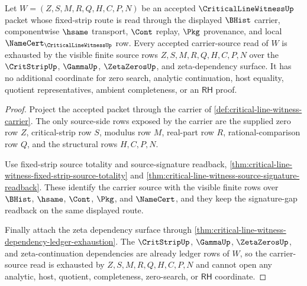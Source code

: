 \begin{theorem}
\label{thm:critical-line-witness-fixed-strip-carrier-source-totality}
Let $W=(Z,S,M,R,Q,H,C,P,N)$ be an accepted $\CriticalLineWitnessUp$ packet whose fixed-strip route is read through the displayed $\BHist$ carrier, componentwise $\hsame$ transport, $\Cont$ replay, $\Pkg$ provenance, and local $\NameCert_{\CriticalLineWitnessUp}$ row. Every accepted carrier-source read of $W$ is exhausted by the visible finite source rows $Z,S,M,R,Q,H,C,P,N$ over the $\CritStripUp$, $\GammaUp$, $\ZetaZerosUp$, and zeta-dependency surface. It has no additional coordinate for zero search, analytic continuation, host equality, quotient representatives, ambient completeness, or an $\mathsf{RH}$ proof.
\end{theorem}
\begin{proof}
Project the accepted packet through the carrier of \autoref{def:critical-line-witness-carrier}. The only source-side rows exposed by the carrier are the supplied zero row $Z$, critical-strip row $S$, modulus row $M$, real-part row $R$, rational-comparison row $Q$, and the structural rows $H,C,P,N$.

Use fixed-strip source totality and source-signature readback, \autoref{thm:critical-line-witness-fixed-strip-source-totality} and \autoref{thm:critical-line-witness-source-signature-readback}. These identify the carrier source with the visible finite rows over $\BHist$, $\hsame$, $\Cont$, $\Pkg$, and $\NameCert$, and they keep the signature-gap readback on the same displayed route.

Finally attach the zeta dependency surface through \autoref{thm:critical-line-witness-dependency-ledger-exhaustion}. The $\CritStripUp$, $\GammaUp$, $\ZetaZerosUp$, and zeta-continuation dependencies are already ledger rows of $W$, so the carrier-source read is exhausted by $Z,S,M,R,Q,H,C,P,N$ and cannot open any analytic, host, quotient, completeness, zero-search, or $\mathsf{RH}$ coordinate.
\end{proof}

